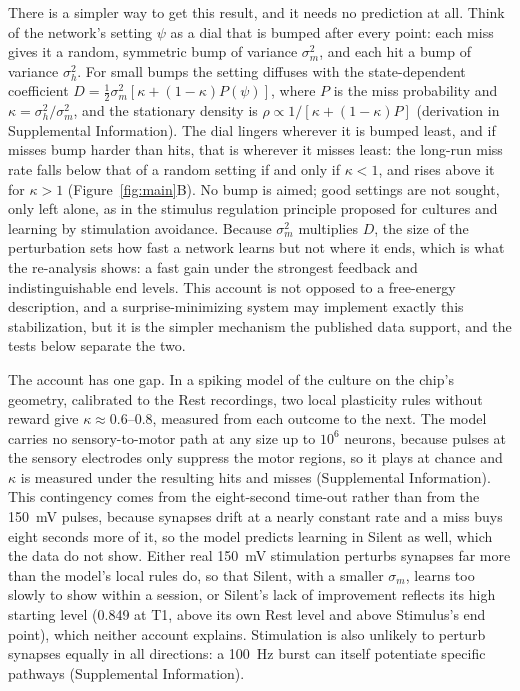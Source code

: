 \documentclass[11pt]{article}
\begin{document}
There is a simpler way to get this result, and it needs no prediction at all. Think of the network's setting $\psi$ as a dial that is bumped after every point: each miss gives it a random, symmetric bump of variance $\sigma_m^2$, and each hit a bump of variance $\sigma_h^2$. For small bumps the setting diffuses with the state-dependent coefficient $D=\tfrac12\sigma_m^2[\kappa+(1-\kappa)P(\psi)]$, where $P$ is the miss probability and $\kappa=\sigma_h^2/\sigma_m^2$, and the stationary density is $\rho\propto1/[\kappa+(1-\kappa)P]$ (derivation in Supplemental Information).\cite{KladkoPRE} The dial lingers wherever it is bumped least, and if misses bump harder than hits, that is wherever it misses least: the long-run miss rate falls below that of a random setting if and only if $\kappa<1$, and rises above it for $\kappa>1$ (Figure~\ref{fig:main}B). No bump is aimed; good settings are not sought, only left alone, as in the stimulus regulation principle proposed for cultures\cite{Shahaf2001} and learning by stimulation avoidance.\cite{Sinapayen2017} Because $\sigma_m^2$ multiplies $D$, the size of the perturbation sets how fast a network learns but not where it ends, which is what the re-analysis shows: a fast gain under the strongest feedback and indistinguishable end levels. This account is not opposed to a free-energy description, and a surprise-minimizing system may implement exactly this stabilization, but it is the simpler mechanism the published data support, and the tests below separate the two.

The account has one gap. In a spiking model of the culture on the chip's geometry, calibrated to the Rest recordings, two local plasticity rules without reward give $\kappa\approx0.6$--$0.8$, measured from each outcome to the next.\cite{KladkoPRE} The model carries no sensory-to-motor path at any size up to $10^6$ neurons, because pulses at the sensory electrodes only suppress the motor regions, so it plays at chance and $\kappa$ is measured under the resulting hits and misses (Supplemental Information). This contingency comes from the eight-second time-out rather than from the 150~mV pulses, because synapses drift at a nearly constant rate and a miss buys eight seconds more of it, so the model predicts learning in Silent as well, which the data do not show. Either real 150~mV stimulation perturbs synapses far more than the model's local rules do, so that Silent, with a smaller $\sigma_m$, learns too slowly to show within a session, or Silent's lack of improvement reflects its high starting level (0.849 at T1, above its own Rest level and above Stimulus's end point), which neither account explains. Stimulation is also unlikely to perturb synapses equally in all directions: a 100~Hz burst can itself potentiate specific pathways (Supplemental Information).
\end{document}
